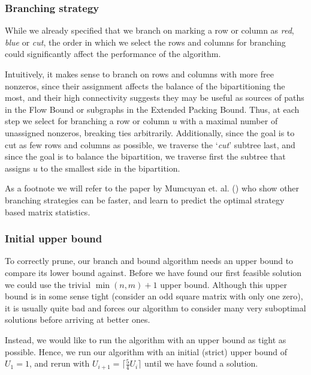 	\subsubsection{Branching strategy}
	While we already specified that we branch on marking a row or column as
	\textit{red}, \textit{blue} or \textit{cut}, the order in which we
	select the rows and columns for branching could significantly affect the
	performance of the algorithm.

	Intuitively, it makes sense to branch on rows and columns with more free
	nonzeros, since their assignment affects the balance of the bipartitioning
	the most, and their high connectivity suggests they may be useful as
	sources of paths in the Flow Bound or subgraphs in the Extended Packing
	Bound. Thus, at each step we select for branching a row or column $u$
	with a maximal
	number of unassigned nonzeros, breaking ties arbitrarily. Additionally,
	since the goal is to cut as few rows and columns as possible, we traverse
	the `\textit{cut}' subtree last, and since the goal is to balance the
	bipartition, we traverse first the subtree that assigns $u$ to the smallest
	side in the bipartition.

	As a footnote we will refer to the paper by Mumcuyan et. al.
	(\cite{mumcuyan18}) who show
	other branching strategies can be faster, and learn to predict the optimal
	strategy based matrix statistics.
	
	\subsubsection{Initial upper bound}

	To correctly prune, our branch and bound algorithm needs an upper bound to
	compare its lower bound against. Before we have found our first feasible
	solution we could use the trivial $\min(n, m) + 1$ upper bound. Although
	this upper bound is in some sense tight (consider an odd square matrix
	with only one zero), it is usually quite bad and forces our algorithm
	to consider many very suboptimal solutions before arriving at better ones.

	Instead, we would like to run the algorithm with an upper bound as tight
	as possible. Hence, we run our algorithm with an initial (strict) upper
	bound of $U_1 = 1$, and rerun with
	$U_{i+1} = \lceil \frac{5}{4} U_i \rceil$ until we have found a solution.
